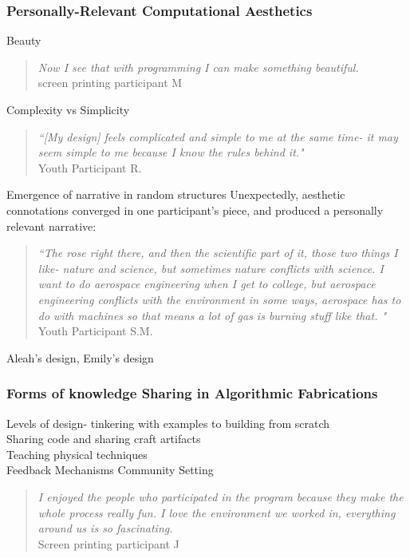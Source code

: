\documentclass{sigchi}
\begin{document}
\subsubsection{Personally-Relevant Computational Aesthetics}
Beauty
\begin{quotation}
	\textit{Now I see that with programming I can make something beautiful.}
	\\screen printing participant M
\end{quotation}
Complexity vs Simplicity
\begin{quotation}
\textit{``[My design] feels complicated and simple to me at the same time- it may seem simple to me because I know the rules behind it."}
\\Youth Participant R.
\end{quotation}
Emergence of narrative in random structures
Unexpectedly, aesthetic connotations converged in one participant's piece, and produced a personally relevant narrative:
\begin{quotation}
\textit{``The rose right there, and then the scientific part of it, those two things I like- nature and science, but sometimes nature conflicts with science. I want to do aerospace engineering when I get to college, but aerospace engineering conflicts with the environment in some ways, aerospace has to do with machines so that means a lot of gas is burning stuff like that. "}
\\Youth Participant S.M.
\end{quotation}
Aleah's design, Emily's design



\subsubsection{Forms of knowledge Sharing in Algorithmic Fabrications}
Levels of design- tinkering with examples to building from scratch\\
Sharing code and sharing craft artifacts\\
Teaching physical techniques\\
Feedback Mechanisms
Community Setting\\
 \begin{quotation}
\textit{I enjoyed the people who participated in the program because they make the whole process really fun. I love the environment we worked in, everything around us is so fascinating.}
\\Screen printing participant J
\end{quotation}
\end{document}
